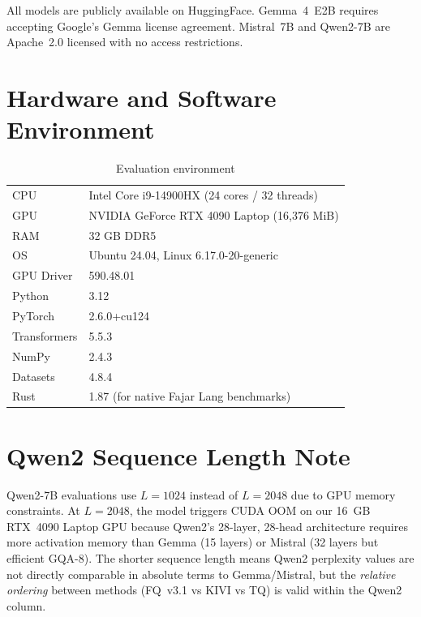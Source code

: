 \documentclass[10pt]{article}
\begin{document}
All models are publicly available on HuggingFace. Gemma~4~E2B requires
accepting Google's Gemma license agreement. Mistral~7B and Qwen2-7B
are Apache~2.0 licensed with no access restrictions.

\section{Hardware and Software Environment}

\begin{table}[h]
\centering
\small
\caption{Evaluation environment}
\begin{tabular}{ll}
\toprule
CPU & Intel Core i9-14900HX (24 cores / 32 threads) \\
GPU & NVIDIA GeForce RTX 4090 Laptop (16,376 MiB) \\
RAM & 32 GB DDR5 \\
OS & Ubuntu 24.04, Linux 6.17.0-20-generic \\
GPU Driver & 590.48.01 \\
\midrule
Python & 3.12 \\
PyTorch & 2.6.0+cu124 \\
Transformers & 5.5.3 \\
NumPy & 2.4.3 \\
Datasets & 4.8.4 \\
Rust & 1.87 (for native Fajar Lang benchmarks) \\
\bottomrule
\end{tabular}
\end{table}

\section{Qwen2 Sequence Length Note}

Qwen2-7B evaluations use $L{=}1024$ instead of $L{=}2048$ due to GPU
memory constraints. At $L{=}2048$, the model triggers CUDA OOM on our
16~GB RTX~4090 Laptop GPU because Qwen2's 28-layer, 28-head architecture
requires more activation memory than Gemma (15 layers) or Mistral (32
layers but efficient GQA-8). The shorter sequence length means Qwen2
perplexity values are not directly comparable in absolute terms to
Gemma/Mistral, but the \emph{relative ordering} between methods
(FQ~v3.1 vs KIVI vs TQ) is valid within the Qwen2 column.

\end{document}
